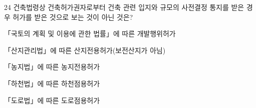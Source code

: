 \begin{question}{24}
건축법령상 건축허가권자로부터 건축 관련 입지와 규모의 사전결정 통지를 받은 경우 허가를 받은 것으로 보는 것이 아닌 것은?
\begin{choices}
  \item 「국토의 계획 및 이용에 관한 법률」에 따른 개발행위허가
  \item 「산지관리법」에 따른 산지전용허가(보전산지가 아님)
  \item 「농지법」에 따른 농지전용허가
  \item 「하천법」에 따른 하천점용허가
  \item 「도로법」에 따른 도로점용허가
\end{choices}
\end{question}
